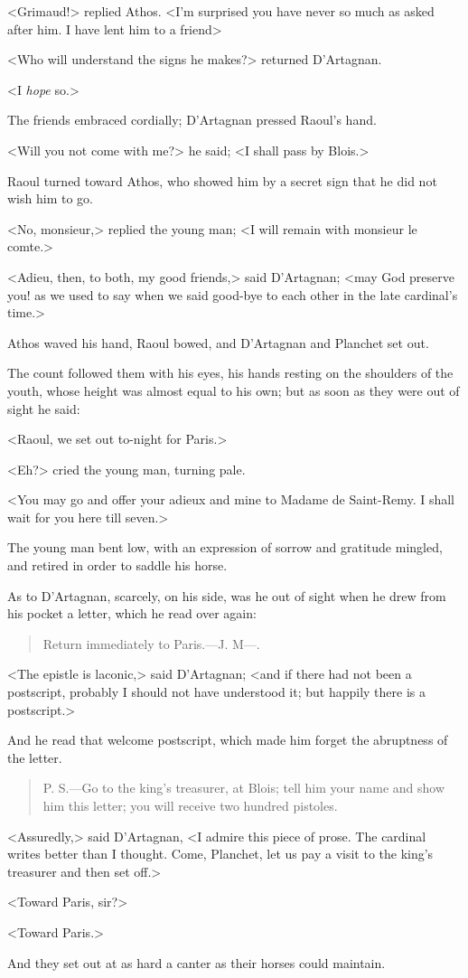 <Grimaud!> replied Athos. <I'm surprised you have never so much as asked after him. I have lent him to a friend\longdash>

<Who will understand the signs he makes?> returned D'Artagnan.

<I \textit{hope} so.>

The friends embraced cordially; D'Artagnan pressed Raoul's hand.

<Will you not come with me?> he said; <I shall pass by Blois.>

Raoul turned toward Athos, who showed him by a secret sign that he did not wish him to go.

<No, monsieur,> replied the young man; <I will remain with monsieur le comte.>

<Adieu, then, to both, my good friends,> said D'Artagnan; <may God preserve you! as we used to say when we said good-bye to each other in the late cardinal's time.>

Athos waved his hand, Raoul bowed, and D'Artagnan and Planchet set out.

The count followed them with his eyes, his hands resting on the shoulders of the youth, whose height was almost equal to his own; but as soon as they were out of sight he said:

<Raoul, we set out to-night for Paris.>

<Eh?> cried the young man, turning pale.

<You may go and offer your adieux and mine to Madame de Saint-Remy. I shall wait for you here till seven.>

The young man bent low, with an expression of sorrow and gratitude mingled, and retired in order to saddle his horse.

As to D'Artagnan, scarcely, on his side, was he out of sight when he drew from his pocket a letter, which he read over again:  
\begin{quote}
	Return immediately to Paris.—J. M—.
	\end{quote}

<The epistle is laconic,> said D'Artagnan; <and if there had not been a postscript, probably I should not have understood it; but happily there is a postscript.>

And he read that welcome postscript, which made him forget the abruptness of the letter. 

\begin{quote}
P. S.—Go to the king's treasurer, at Blois; tell him your name and show him this letter; you will receive two hundred pistoles.
	\end{quote}

<Assuredly,> said D'Artagnan, <I admire this piece of prose. The cardinal writes better than I thought. Come, Planchet, let us pay a visit to the king's treasurer and then set off.>

<Toward Paris, sir?>

<Toward Paris.>

And they set out at as hard a canter as their horses could maintain. 